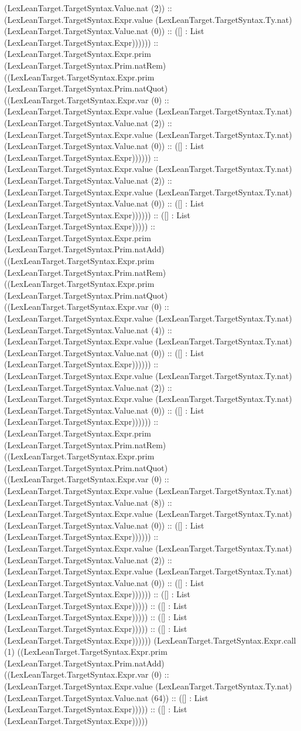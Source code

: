\documentclass[11pt]{article}
\begin{document}
(LexLeanTarget.TargetSyntax.Value.nat (2)) :: (LexLeanTarget.TargetSyntax.Expr.value (LexLeanTarget.TargetSyntax.Ty.nat) (LexLeanTarget.TargetSyntax.Value.nat (0)) :: ([] : List (LexLeanTarget.TargetSyntax.Expr)))))) :: (LexLeanTarget.TargetSyntax.Expr.prim (LexLeanTarget.TargetSyntax.Prim.natRem) ((LexLeanTarget.TargetSyntax.Expr.prim (LexLeanTarget.TargetSyntax.Prim.natQuot) ((LexLeanTarget.TargetSyntax.Expr.var (0) :: (LexLeanTarget.TargetSyntax.Expr.value (LexLeanTarget.TargetSyntax.Ty.nat) (LexLeanTarget.TargetSyntax.Value.nat (2)) :: (LexLeanTarget.TargetSyntax.Expr.value (LexLeanTarget.TargetSyntax.Ty.nat) (LexLeanTarget.TargetSyntax.Value.nat (0)) :: ([] : List (LexLeanTarget.TargetSyntax.Expr)))))) :: (LexLeanTarget.TargetSyntax.Expr.value (LexLeanTarget.TargetSyntax.Ty.nat) (LexLeanTarget.TargetSyntax.Value.nat (2)) :: (LexLeanTarget.TargetSyntax.Expr.value (LexLeanTarget.TargetSyntax.Ty.nat) (LexLeanTarget.TargetSyntax.Value.nat (0)) :: ([] : List (LexLeanTarget.TargetSyntax.Expr)))))) :: ([] : List (LexLeanTarget.TargetSyntax.Expr))))) :: (LexLeanTarget.TargetSyntax.Expr.prim (LexLeanTarget.TargetSyntax.Prim.natAdd) ((LexLeanTarget.TargetSyntax.Expr.prim (LexLeanTarget.TargetSyntax.Prim.natRem) ((LexLeanTarget.TargetSyntax.Expr.prim (LexLeanTarget.TargetSyntax.Prim.natQuot) ((LexLeanTarget.TargetSyntax.Expr.var (0) :: (LexLeanTarget.TargetSyntax.Expr.value (LexLeanTarget.TargetSyntax.Ty.nat) (LexLeanTarget.TargetSyntax.Value.nat (4)) :: (LexLeanTarget.TargetSyntax.Expr.value (LexLeanTarget.TargetSyntax.Ty.nat) (LexLeanTarget.TargetSyntax.Value.nat (0)) :: ([] : List (LexLeanTarget.TargetSyntax.Expr)))))) :: (LexLeanTarget.TargetSyntax.Expr.value (LexLeanTarget.TargetSyntax.Ty.nat) (LexLeanTarget.TargetSyntax.Value.nat (2)) :: (LexLeanTarget.TargetSyntax.Expr.value (LexLeanTarget.TargetSyntax.Ty.nat) (LexLeanTarget.TargetSyntax.Value.nat (0)) :: ([] : List (LexLeanTarget.TargetSyntax.Expr)))))) :: (LexLeanTarget.TargetSyntax.Expr.prim (LexLeanTarget.TargetSyntax.Prim.natRem) ((LexLeanTarget.TargetSyntax.Expr.prim (LexLeanTarget.TargetSyntax.Prim.natQuot) ((LexLeanTarget.TargetSyntax.Expr.var (0) :: (LexLeanTarget.TargetSyntax.Expr.value (LexLeanTarget.TargetSyntax.Ty.nat) (LexLeanTarget.TargetSyntax.Value.nat (8)) :: (LexLeanTarget.TargetSyntax.Expr.value (LexLeanTarget.TargetSyntax.Ty.nat) (LexLeanTarget.TargetSyntax.Value.nat (0)) :: ([] : List (LexLeanTarget.TargetSyntax.Expr)))))) :: (LexLeanTarget.TargetSyntax.Expr.value (LexLeanTarget.TargetSyntax.Ty.nat) (LexLeanTarget.TargetSyntax.Value.nat (2)) :: (LexLeanTarget.TargetSyntax.Expr.value (LexLeanTarget.TargetSyntax.Ty.nat) (LexLeanTarget.TargetSyntax.Value.nat (0)) :: ([] : List (LexLeanTarget.TargetSyntax.Expr)))))) :: ([] : List (LexLeanTarget.TargetSyntax.Expr))))) :: ([] : List (LexLeanTarget.TargetSyntax.Expr))))) :: ([] : List (LexLeanTarget.TargetSyntax.Expr))))) :: ([] : List (LexLeanTarget.TargetSyntax.Expr)))))) (LexLeanTarget.TargetSyntax.Expr.call (1) ((LexLeanTarget.TargetSyntax.Expr.prim (LexLeanTarget.TargetSyntax.Prim.natAdd) ((LexLeanTarget.TargetSyntax.Expr.var (0) :: (LexLeanTarget.TargetSyntax.Expr.value (LexLeanTarget.TargetSyntax.Ty.nat) (LexLeanTarget.TargetSyntax.Value.nat (64)) :: ([] : List (LexLeanTarget.TargetSyntax.Expr))))) :: ([] : List (LexLeanTarget.TargetSyntax.Expr))))) 
\end{document}
